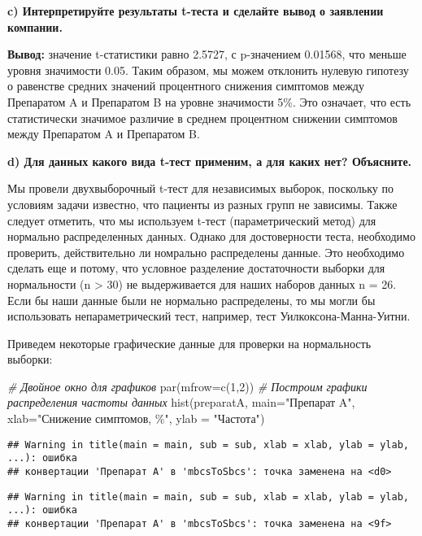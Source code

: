\documentclass[
]{article}
\newenvironment{Shaded}{\begin{snugshade}}{\end{snugshade}}
\newcommand{\AttributeTok}[1]{\textcolor[rgb]{0.77,0.63,0.00}{#1}}
\newcommand{\CommentTok}[1]{\textcolor[rgb]{0.56,0.35,0.01}{\textit{#1}}}
\newcommand{\DecValTok}[1]{\textcolor[rgb]{0.00,0.00,0.81}{#1}}
\newcommand{\FunctionTok}[1]{\textcolor[rgb]{0.00,0.00,0.00}{#1}}
\newcommand{\NormalTok}[1]{#1}
\newcommand{\StringTok}[1]{\textcolor[rgb]{0.31,0.60,0.02}{#1}}
\begin{document}
\textbf{c) Интерпретируйте результаты t-теста и сделайте вывод о
заявлении компании.}

\textbf{Вывод:} значение t-статистики равно 2.5727, с p-значением
0.01568, что меньше уровня значимости 0.05. Таким образом, мы можем
отклонить нулевую гипотезу о равенстве средних значений процентного
снижения симптомов между Препаратом A и Препаратом B на уровне
значимости 5\%. Это означает, что есть статистически значимое различие в
среднем процентном снижении симптомов между Препаратом A и Препаратом B.

\textbf{d) Для данных какого вида t-тест применим, а для каких нет?
Объясните.}

Мы провели двухвыборочный t-тест для независимых выборок, поскольку по
условиям задачи известно, что пациенты из разных групп не зависимы.
Также следует отметить, что мы используем t-тест (параметрический метод)
для нормально распределенных данных. Однако для достоверности теста,
необходимо проверить, действительно ли номрально распределены данные.
Это необходимо сделать еще и потому, что условное разделение
достаточности выборки для нормальности (n \textgreater{} 30) не
выдерживается для наших наборов данных n = 26. Если бы наши данные были
не нормально распределены, то мы могли бы использовать непараметрический
тест, например, тест Уилкоксона-Манна-Уитни.

Приведем некоторые графические данные для проверки на нормальность
выборки:

\begin{Shaded}
\begin{Highlighting}[]
\CommentTok{\# Двойное окно для графиков}
\FunctionTok{par}\NormalTok{(}\AttributeTok{mfrow=}\FunctionTok{c}\NormalTok{(}\DecValTok{1}\NormalTok{,}\DecValTok{2}\NormalTok{))}
\CommentTok{\# Построим графики распределения частоты данных }
\FunctionTok{hist}\NormalTok{(preparatA, }\AttributeTok{main=}\StringTok{"Препарат A"}\NormalTok{, }\AttributeTok{xlab=}\StringTok{"Снижение симптомов, \%"}\NormalTok{, }\AttributeTok{ylab =} \StringTok{"Частота"}\NormalTok{)}
\end{Highlighting}
\end{Shaded}

\begin{verbatim}
## Warning in title(main = main, sub = sub, xlab = xlab, ylab = ylab, ...): ошибка
## конвертации 'Препарат A' в 'mbcsToSbcs': точка заменена на <d0>
\end{verbatim}

\begin{verbatim}
## Warning in title(main = main, sub = sub, xlab = xlab, ylab = ylab, ...): ошибка
## конвертации 'Препарат A' в 'mbcsToSbcs': точка заменена на <9f>
\end{verbatim}
\end{document}
